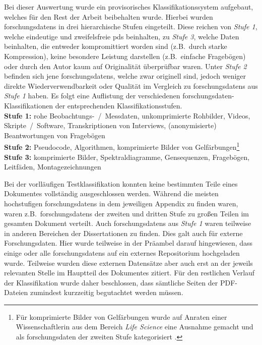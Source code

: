 Bei dieser Auswertung wurde ein provisorisches Klassifikationssystem aufgebaut, welches für den Rest der Arbeit beibehalten wurde.
Hierbei wurden \glspl{forschungsdaten} in drei hierarchische Stufen eingeteilt.
Diese reichen von \textit{Stufe 1}, welche eindeutige und zweifelsfreie \glspl{pd} beinhalten, zu \textit{Stufe 3}, welche Daten beinhalten, die entweder kompromittiert worden sind (z.B.~durch starke Kompression), keine besondere Leistung darstellen (z.B.~einfache Fragebögen) oder durch den Autor kaum auf Originalität überprüfbar waren.
Unter \textit{Stufe 2} befinden sich jene \glspl{forschungsdaten}, welche zwar originell sind, jedoch weniger direkte Wiederverwendbarkeit oder Qualität im Vergleich zu \glspl{forschungsdaten} aus \textit{Stufe 1} haben.
Es folgt eine Auflistung der verschiedenen \gls{forschungsdaten}-Klassifikationen der entsprechenden Klassifikationsstufen.\\
\textbf{Stufe 1:} rohe Beobachtungs-~/~Messdaten, unkomprimierte Rohbilder, Videos, Skripte~/~Software, Transkriptionen von Interviews, (anonymisierte) Beantwortungen von Fragebögen\\
\textbf{Stufe 2:} Pseudocode, Algorithmen, komprimierte Bilder von Gelfärbungen\footnote{Für komprimierte Bilder von Gelfärbungen wurde auf Anraten einer Wissenschaftlerin aus dem Bereich \textit{Life Science} eine Ausnahme gemacht und als \gls{forschungsdaten} der zweiten Stufe kategorisiert \autocite{SarahPC}.}\\
\textbf{Stufe 3:} komprimierte Bilder, Spektraldiagramme, Gensequenzen, Fragebögen, Leitfäden, Montagezeichnungen

Bei der vorlläufigen Testklassifikation konnten keine bestimmten Teile eines Dokumentes vollständig ausgeschlossen werden.
Während die meisten hochstufigen \glspl{forschungsdaten} in dem jeweiligen Appendix zu finden waren, waren z.B.~\glspl{forschungsdaten} der zweiten und dritten Stufe zu großen Teilen im gesamten Dokument verteilt.
Auch \glspl{forschungsdaten} aus \textit{Stufe 1} waren teilweise in anderen Bereichen der Dissertationen zu finden.
Dies galt auch für externe Forschungsdaten.
Hier wurde teilweise in der Präambel darauf hingewiesen, dass einige oder alle \glspl{forschungsdaten} auf ein externes Repositorium hochgeladen wurde.
Teilweise wurden diese externen Datensätze aber auch erst an der jeweils relevanten Stelle im Hauptteil des Dokumentes zitiert.
Für den restlichen Verlauf der Klassifikation wurde daher beschlossen, dass sämtliche Seiten der PDF-Dateien zumindest kurzzeitig begutachtet werden müssen.

